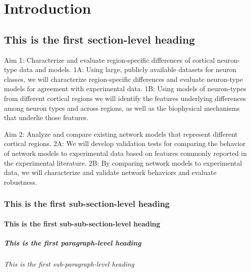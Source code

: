 \chapter{Introduction}

\lipsum[1]

\section{This is the first section-level heading}


Aim 1: Characterize and evaluate region-specific differences of cortical neuron-type data and models.
1A: Using large, publicly available datasets for neuron classes, we will characterize region-specific differences and evaluate neuron-type models for agreement with experimental data.
1B: Using models of neuron-types from different cortical regions we will identify the features underlying differences among neuron types and across regions, as well as the biophysical mechanisms that underlie those features. 

Aim 2: Analyze and compare existing network models that represent different cortical regions.
2A: We will develop validation tests for comparing the behavior of network models to experimental data based on features commonly reported in the experimental literature.
2B: By comparing network models to experimental data, we will characterize and validate network behaviors and evaluate robustness.	

\subsection{This is the first sub-section-level heading}

\lipsum[1]

\subsubsection{This is the first sub-sub-section-level heading}

\lipsum[1]

\paragraph{This is the first paragraph-level heading}

\lipsum[1]

\subparagraph{This is the first sub-paragraph-level heading}

\lipsum[1]

